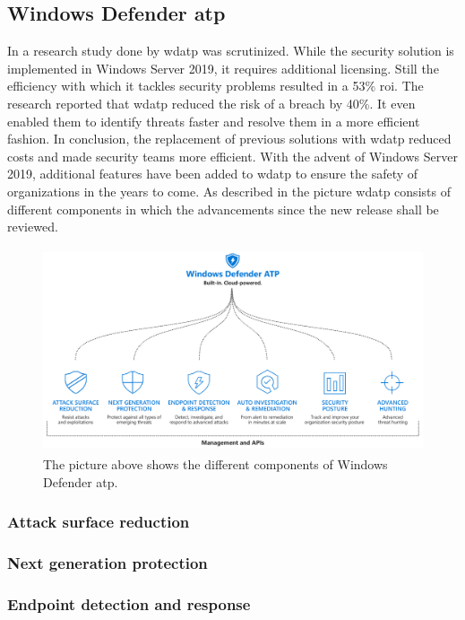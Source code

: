 \subsection{Windows Defender \acrfull{atp}}
In a research study done by \cite{Musto2017} \acrfull{wdatp} was scrutinized. While the security solution is implemented in Windows Server 2019, it requires additional licensing. Still the efficiency with which it tackles security problems resulted in a 53\% \acrfull{roi}. The research reported that \acrshort{wdatp} reduced the risk of a breach by 40\%. It even enabled them to identify threats faster and resolve them in a more efficient fashion. In conclusion, the replacement of previous solutions with \acrlong{wdatp} reduced costs and made security teams more efficient. With the advent of Windows Server 2019, additional features have been added to \acrlong{wdatp} to ensure the safety of organizations in the years to come. As described in the picture \acrshort{wdatp} consists of different components in which the advancements since the new release shall be reviewed. 

\begin{figure}[hbt!]
	\centering
	\includegraphics[width=\textwidth,height=6cm,keepaspectratio=true]{img/Windows-Defender-ATP.png}
	\caption{The picture above \autocite{WDATPT2018} shows the different components of Windows Defender \acrlong{atp}.}
	\label{fig:WDATPT2018}
\end{figure}
\subsubsection{Attack surface reduction}

\subsubsection{Next generation protection}
\subsubsection{Endpoint detection and response}
